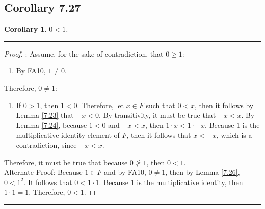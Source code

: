 \documentclass[openany, amssymb, psamsfonts]{amsart}
\newtheorem{cor}{Corollary}[section]
\theoremstyle{definition}
\numberwithin{equation}{section}
\begin{document}
\subsection*{Corollary 7.27}
\begin{cor}
\label{7.27}
	$0 < 1$.
\end{cor}
\vspace{4pt}     \hrule   \vspace{4pt}
\begin{proof}:
Assume, for the sake of contradiction, that $0\geq 1$:
\begin{enumerate}
    \item By FA10, $1\neq 0$.
\end{enumerate}
Therefore, $0\neq 1$:
\begin{enumerate}
    \item If $0>1$, then $1<0$. Therefore, let $x\in F$ such that $0<x$, then it follows by Lemma \ref{7.23} that $-x<0$. By transitivity, it must be true that $-x<x$. By Lemma \ref{7.24}, because $1<0$ and $-x<x$, then $1\cdot x<1\cdot -x$. Because $1$ is the multiplicative identity element of $F$, then it follows that $x<-x$, which is a contradiction, since $-x<x$.
\end{enumerate}
Therefore, it must be true that because $0\not \geq 1$, then $0<1$.\\
Alternate Proof: Because $1\in F$ and by FA10, $0\neq 1$, then by Lemma \ref{7.26}, $0 < 1^2$. It follows that $0< 1\cdot 1 $. Because $1$ is the multiplicative identity, then $1\cdot 1 = 1$. Therefore, $0<1$.
 \end{proof}
\vspace{4pt}     \hrule   \vspace{4pt}
\end{document}
